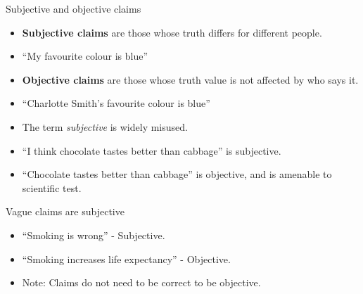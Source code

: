 \documentclass{beamer}
\begin{document}
\begin{frame}{Subjective and objective claims}
	\begin{itemize}
		\item \textbf{Subjective claims} are those whose truth differs for different people.
		\item ``My favourite colour is blue''
		\item \textbf{Objective claims} are those whose truth value is not affected by who says it.
		\item ``Charlotte Smith's favourite colour is blue''
		\item The term \emph{subjective} is widely misused.
		\item ``I think chocolate tastes better than cabbage'' is subjective.
		\item ``Chocolate tastes better than cabbage'' is objective, and is amenable to scientific test.
	\end{itemize}
\end{frame}

\begin{frame}{Vague claims are subjective}
\begin{itemize}
\item ``Smoking is wrong'' - Subjective.
\item ``Smoking increases life expectancy'' - Objective.
\item Note: Claims do not need to be correct to be objective.
\end{itemize}
\end{frame}
\end{document}
